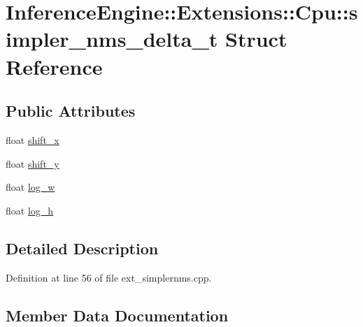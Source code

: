 \hypertarget{structInferenceEngine_1_1Extensions_1_1Cpu_1_1simpler__nms__delta__t}{}\section{Inference\+Engine\+:\+:Extensions\+:\+:Cpu\+:\+:simpler\+\_\+nms\+\_\+delta\+\_\+t Struct Reference}
\label{structInferenceEngine_1_1Extensions_1_1Cpu_1_1simpler__nms__delta__t}
\subsection*{Public Attributes}
\begin{DoxyCompactItemize}
\item 
float \hyperlink{structInferenceEngine_1_1Extensions_1_1Cpu_1_1simpler__nms__delta__t_afc83c32631c8a943fd4d61f0ed6f3872}{shift\+\_\+x}
\item 
float \hyperlink{structInferenceEngine_1_1Extensions_1_1Cpu_1_1simpler__nms__delta__t_a2752cf9fb035970261e908f304eb65e3}{shift\+\_\+y}
\item 
float \hyperlink{structInferenceEngine_1_1Extensions_1_1Cpu_1_1simpler__nms__delta__t_a1814b4462c79d523288f22337165e63b}{log\+\_\+w}
\item 
float \hyperlink{structInferenceEngine_1_1Extensions_1_1Cpu_1_1simpler__nms__delta__t_ac0f620def60fb6979f94630da2ffa79d}{log\+\_\+h}
\end{DoxyCompactItemize}


\subsection{Detailed Description}


Definition at line 56 of file ext\+\_\+simplernms.\+cpp.



\subsection{Member Data Documentation}
